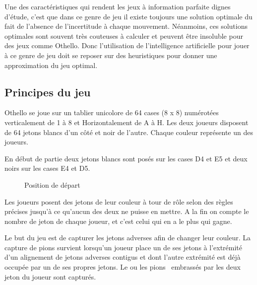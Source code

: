 \documentclass[11pt]{article}
\begin{document}
Une des caractéristiques qui rendent les jeux à information parfaite
dignes d'étude, c'est que dans ce genre de jeu il existe toujours une
solution optimale du fait de l'absence de l'incertitude à chaque
mouvement. Néanmoins, ces solutions optimales sont souvent très
couteuses à calculer et peuvent être insoluble pour des jeux comme
Othello. Donc l'utilisation de l'intelligence artificielle pour jouer à ce
genre de jeu doit se reposer sur des heuristiques pour donner une
approximation du jeu optimal.

\subsection{Principes du jeu}

Othello se joue sur un tablier unicolore de 64 cases (8 x 8)
numérotées verticalement de 1 à 8 et Horizontalement de A à H.
Les deux joueurs disposent de 64 jetons blancs d'un côté et noir de
l'autre. Chaque couleur représente un des joueurs.

En début de partie deux jetons blancs sont posés sur les cases D4 et
E5 et deux noirs sur les cases E4 et D5.





\begin{figure}[h]
  \caption{Position de départ}
  
    \noindent{}  
\end{figure}

Les joueurs posent des jetons de leur couleur à tour de rôle selon des
règles précises jusqu'à ce qu'aucun des deux ne puisse en mettre.
A la fin on compte le nombre de jeton de chaque joueur, et c'est celui qui en
a le plus qui gagne.

Le but du jeu est de capturer les jetons adverses afin de changer leur
couleur. La capture de pions survient lorsqu'un joueur place un de ses jetons
à l'extrémité d'un alignement de jetons adverses contigus et dont
l'autre extrémité est déjà occupée par un de ses propres
jetons. Le ou les pions \ embrassés par les deux jeton du joueur sont
capturés.
\end{document}
